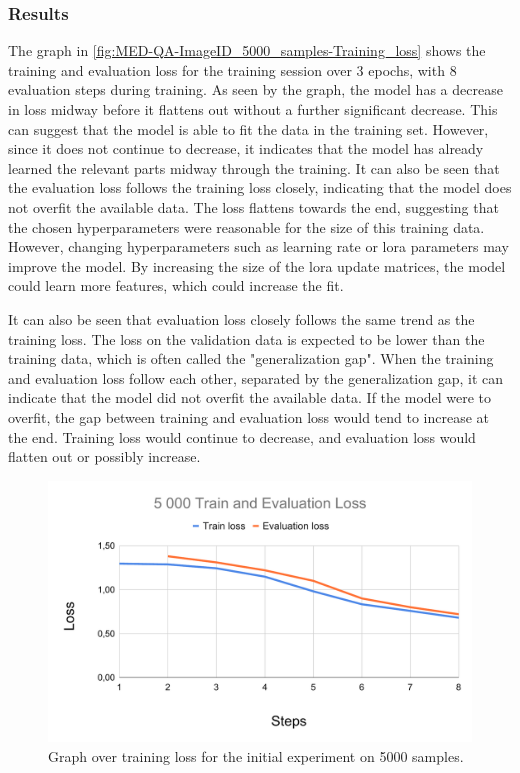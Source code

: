     \subsubsection{Results}


    The graph in \autoref{fig:MED-QA-ImageID_5000_samples-Training_loss} shows the training and evaluation loss for the training session over 3 epochs, with 8 evaluation steps during training. As seen by the graph, the model has a decrease in loss midway before it flattens out without a further significant decrease. This can suggest that the model is able to fit the data in the training set. However, since it does not continue to decrease, it indicates that the model has already learned the relevant parts midway through the training. It can also be seen that the evaluation loss follows the training loss closely, indicating that the model does not overfit the available data. The loss flattens towards the end, suggesting that the chosen hyperparameters were reasonable for the size of this training data. 
    However, changing hyperparameters such as learning rate or \gls{lora} parameters may improve the model. By increasing the size of the \gls{lora} update matrices, the model could learn more features, which could increase the fit.

    It can also be seen that evaluation loss closely follows the same trend as the training loss. The loss on the validation data is expected to be lower than the training data, which is often called the "generalization gap". When the training and evaluation loss follow each other, separated by the generalization gap, it can indicate that the model did not overfit the available data. If the model were to overfit, the gap between training and evaluation loss would tend to increase at the end. Training loss would continue to decrease, and evaluation loss would flatten out or possibly increase. 
    
    
    \begin{figure}[htb]
        \centering
        \includegraphics[width=\linewidth]{images/MED-QA-ImageID_5000_samples-Training_loss}
        \caption{Graph over training loss for the initial experiment on 5000 samples.}
        \label{fig:MED-QA-ImageID_5000_samples-Training_loss}
    \end{figure} 


